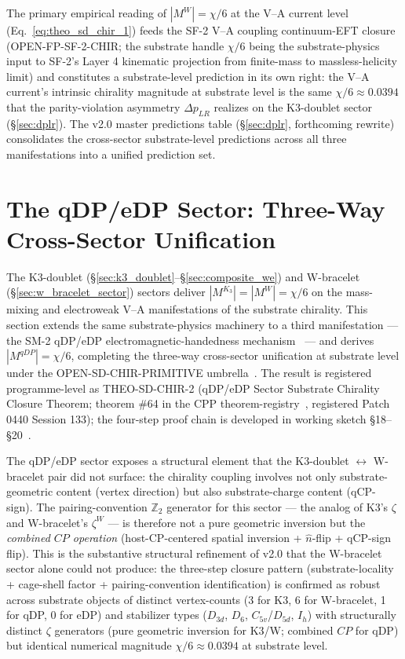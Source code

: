 \documentclass[11pt,letterpaper]{article}
\newcommand{\Kthree}{\ensuremath{K_3}}
\newcommand{\DeltapLR}{\Delta p_{LR}}
\newcommand{\Dsix}{D_6}
\begin{document}
The primary empirical reading of $|M^W| = \chi/6$ at the V--A current level (Eq.~\eqref{eq:theo_sd_chir_1}) feeds the SF-2 V--A coupling continuum-EFT closure (OPEN-FP-SF-2-CHIR; the substrate handle $\chi/6$ being the substrate-physics input to SF-2's Layer 4 kinematic projection from finite-mass to massless-helicity limit) and constitutes a substrate-level prediction in its own right: the V--A current's intrinsic chirality magnitude at substrate level is the same $\chi/6 \approx 0.0394$ that the parity-violation asymmetry $\DeltapLR$ realizes on the K3-doublet sector (\S\ref{sec:dplr}). The v2.0 master predictions table (\S\ref{sec:dplr}, forthcoming rewrite) consolidates the cross-sector substrate-level predictions across all three manifestations into a unified prediction set.

\section{The qDP/eDP Sector: Three-Way Cross-Sector Unification}\label{sec:qdp_edp_sector}

The K3-doublet (\S\ref{sec:k3_doublet}--\S\ref{sec:composite_we}) and W-bracelet (\S\ref{sec:w_bracelet_sector}) sectors deliver $|M^{\Kthree}| = |M^W| = \chi/6$ on the mass-mixing and electroweak V--A manifestations of the substrate chirality. This section extends the same substrate-physics machinery to a third manifestation --- the SM-2 qDP/eDP electromagnetic-handedness mechanism~\cite{abshier_sm2} --- and derives $|M^{qDP}| = \chi/6$, completing the three-way cross-sector unification at substrate level under the OPEN-SD-CHIR-PRIMITIVE umbrella~\cite{abshier_research_frontier}. The result is registered programme-level as THEO-SD-CHIR-2 (qDP/eDP Sector Substrate Chirality Closure Theorem; theorem \#64 in the CPP theorem-registry~\cite{abshier_theorem_registry}, registered Patch 0440 Session 133); the four-step proof chain is developed in working sketch \S18--\S20~\cite{abshier_capotauro_chiral_mechanism_sketch}.

The qDP/eDP sector exposes a structural element that the K3-doublet $\leftrightarrow$ W-bracelet pair did not surface: the chirality coupling involves not only substrate-geometric content (vertex direction) but also substrate-charge content (qCP-sign). The pairing-convention $\mathbb{Z}_2$ generator for this sector --- the analog of K3's $\zeta$ and W-bracelet's $\zeta^W$ --- is therefore not a pure geometric inversion but the \emph{combined $CP$ operation} (host-CP-centered spatial inversion + $\hat{n}$-flip + qCP-sign flip). This is the substantive structural refinement of v2.0 that the W-bracelet sector alone could not produce: the three-step closure pattern (substrate-locality + cage-shell factor + pairing-convention identification) is confirmed as robust across substrate objects of distinct vertex-counts (3 for K3, 6 for W-bracelet, 1 for qDP, 0 for eDP) and stabilizer types ($D_{3d}$, $\Dsix$, $C_{5v}$/$D_{5d}$, $I_h$) with structurally distinct $\zeta$ generators (pure geometric inversion for K3/W; combined $CP$ for qDP) but identical numerical magnitude $\chi/6 \approx 0.0394$ at substrate level.
\end{document}
